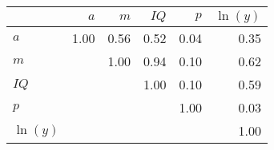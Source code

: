 \begin{tabular}{lrrrrr}
\hline
 & $a$  & $m$  & $IQ$  & $p$  & $\ln(y)$  \\
\hline
$a$ & 1.00  & 0.56  & 0.52  & 0.04  & 0.35  \\
$m$ &   & 1.00  & 0.94  & 0.10  & 0.62  \\
$IQ$ &   &   & 1.00  & 0.10  & 0.59  \\
$p$ &   &   &   & 1.00  & 0.03  \\
$\ln(y)$ &   &   &   &   & 1.00  \\
\hline
\end{tabular}%
